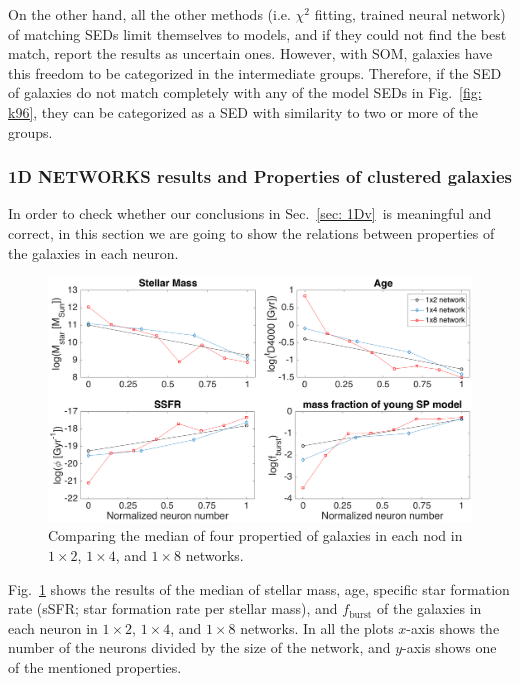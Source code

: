             On the other hand, all the other methods (i.e. $\chi^2$ fitting, trained neural network) of matching SEDs limit themselves to models, and if they could not find the best match, report the results as uncertain ones.
            However, with SOM, galaxies have this freedom to be categorized in the intermediate groups.
            Therefore, if the SED of galaxies do not match completely with any of the model SEDs in Fig.~\ref{fig: k96}, they can be categorized as a SED with similarity to two or more of the groups.

                        
        
        
        \subsubsection{1D NETWORKS results and Properties of clustered galaxies}
        
        In order to check whether our conclusions in Sec.~\ref{sec: 1Dv}~is meaningful and correct, in this section we are going to show the relations between properties of the galaxies in each neuron.
        
        \begin{figure}
            \centering
            \includegraphics[width=\textwidth]{../images0.01/1d/props5.png}
            \caption{Comparing the median of four propertied of galaxies in each nod in $1\times2$, $1\times4$, and $1\times8$ networks.}
            \label{fig: props}
        \end{figure}
       
        Fig.~\ref{fig: props} shows the results of the median of stellar mass, age, specific star formation rate (sSFR; star formation rate per stellar mass), and $f_\mathrm{burst}$ of the galaxies in each neuron in $1\times2$, $1\times4$, and $1\times8$ networks.
        In all the plots $x$-axis shows the number of the neurons divided by the size of the network, and $y$-axis shows one of the mentioned properties. 
        

